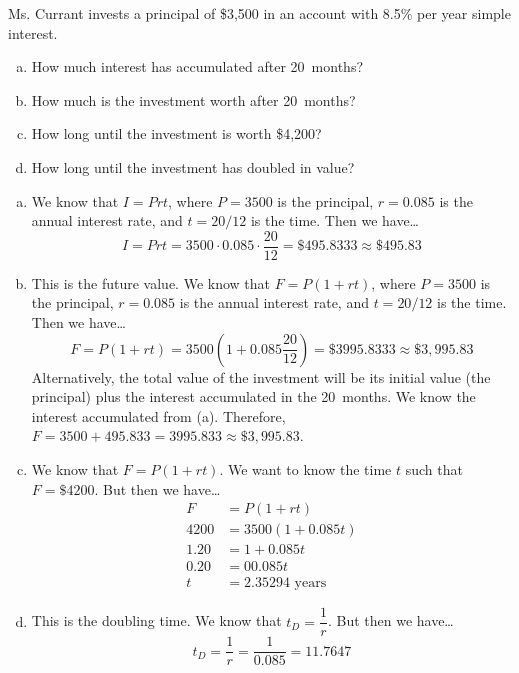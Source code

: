 \documentclass[11pt,letterpaper]{article}
\begin{document}

 Ms. Currant invests a principal of \$3,500 in an account with 8.5\% per year simple interest.
	\begin{enumerate}[(a)]
	\item How much interest has accumulated after 20~months?
	\item How much is the investment worth after 20~months?
	\item How long until the investment is worth \$4,200?
	\item How long until the investment has doubled in value?
	\end{enumerate} \pspace

\sol
\begin{enumerate}[(a)]
\item We know that $I= Prt$, where $P= 3500$ is the principal, $r= 0.085$ is the annual interest rate, and $t= 20/12$ is the time. Then we have\dots
	\[
	I= Prt= 3500 \cdot 0.085 \cdot \dfrac{20}{12}= \$495.8333 \approx \$495.83
	\] \pspace

\item This is the future value. We know that $F= P(1 + rt)$, where $P= 3500$ is the principal, $r= 0.085$ is the annual interest rate, and $t= 20/12$ is the time. Then we have\dots
	\[
	F= P(1 + rt)= 3500 \left(1 + 0.085 \dfrac{20}{12} \right)= \$3995.8333 \approx \$3,995.83
	\]
Alternatively, the total value of the investment will be its initial value (the principal) plus the interest accumulated in the 20~months. We know the interest accumulated from (a). Therefore, $F= 3500 + 495.833= 3995.833 \approx \$3,995.83$. \pspace

\item We know that $F= P(1 + rt)$. We want to know the time $t$ such that $F= \$4200$. But then we have\dots
	\[
	\begin{aligned}
	F&= P(1 + rt) \\
	4200&= 3500(1 + 0.085t) \\
	1.20&= 1 + 0.085t \\
	0.20&= 0 0.085t \\
	t&= 2.35294 \text{ years}
	\end{aligned}
	\] \pspace

\item This is the doubling time. We know that $t_D= \dfrac{1}{r}$. But then we have\dots
	\[
	t_D= \dfrac{1}{r}= \dfrac{1}{0.085}= 11.7647
	\]
\end{enumerate}
\end{document}
